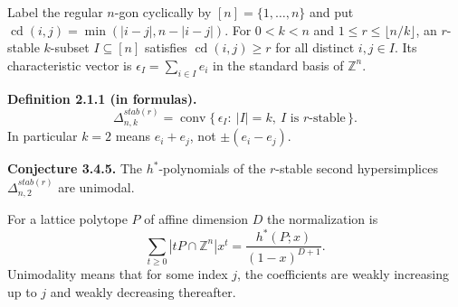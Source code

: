 \documentclass{article}
\newcommand{\rstablentwo}{\Delta_{n,2}^{stab(r)}}
\begin{document}
Label the regular $n$-gon cyclically by $[n]=\{1,\ldots,n\}$ and put
$\operatorname{cd}(i,j)=\min(|i-j|,n-|i-j|)$.
For $0<k<n$ and $1\le r\le\lfloor n/k\rfloor$, an $r$-stable $k$-subset
$I\subseteq[n]$ satisfies $\operatorname{cd}(i,j)\ge r$ for all distinct
$i,j\in I$. Its characteristic vector is $\epsilon_I=\sum_{i\in I} e_i$
in the standard basis of $\mathbb Z^n$.

\noindent\textbf{Definition 2.1.1 (in formulas).}
\[
\Delta_{n,k}^{stab(r)}=\operatorname{conv}
 \{\,\epsilon_I:\ |I|=k,\ I\text{ is }r\text{-stable}\,\}.
\]
In particular $k=2$ means $e_i+e_j$, not $\pm(e_i-e_j)$.

\noindent\textbf{Conjecture 3.4.5.}
The $h^*$-polynomials of the $r$-stable second hypersimplices
$\rstablentwo$ are unimodal.

For a lattice polytope $P$ of affine dimension $D$ the normalization is
\[
\sum_{t\ge0}|tP\cap\mathbb Z^n|x^t =
\frac{h^*(P;x)}{(1-x)^{D+1}}.
\]
Unimodality means that for some index $j$, the coefficients are weakly
increasing up to $j$ and weakly decreasing thereafter.
\end{document}
